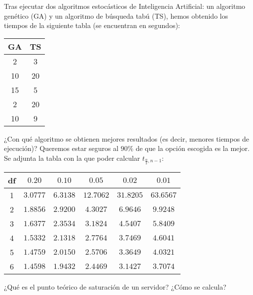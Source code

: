 \documentclass[12pt]{article}
\begin{document}
    \begin{ejercicio}[2 puntos]
        Tras ejecutar dos algoritmos estocásticos de Inteligencia Artificial: un algoritmo genético (GA) y un algoritmo de búsqueda tabú (TS), hemos obtenido los tiempos de la siguiente tabla (se encuentran en segundos):
        \begin{table}[H]
        \centering
        \begin{tabular}{c|c}
            GA & TS \\
            \hline
            2 & 3 \\
            10 & 20 \\
            15 & 5 \\
            2 & 20 \\
            10 & 9
        \end{tabular}
        \end{table}
        ¿Con qué algoritmo se obtienen mejores resultados (es decir, menores tiempos de ejecución)? Queremos estar seguros al $90\%$ de que la opción escogida es la mejor. Se adjunta la tabla con la que poder calcular $t_{\frac{\alpha}{2},n-1}$:
        \begin{table}[H]
        \centering
        \begin{tabular}{c|c|c|c|c|c}
            df & $0.20$ & $0.10$ & $0.05$ & $0.02$ & $0.01$ \\
            \hline
            1 & $3.0777$ & $6.3138$ & $12.7062$ & $31.8205$ & $63.6567$ \\
            \hline
            2 & $1.8856$ & $2.9200$ & $4.3027$ & $6.9646$ & $9.9248$ \\
            \hline
            3 & $1.6377$ & $2.3534$ & $3.1824$ & $4.5407$ & $5.8409$ \\
            \hline
            4 & $1.5332$ & $2.1318$ & $2.7764$ & $3.7469$ & $4.6041$ \\
            \hline
            5 & $1.4759$ & $2.0150$ & $2.5706$ & $3.3649$ & $4.0321$ \\
            \hline
            6 & $1.4598$ & $1.9432$ & $2.4469$ & $3.1427$ & $3.7074$
        \end{tabular}
        \end{table}
    \end{ejercicio}

    \begin{ejercicio}[1 punto]
        ¿Qué es el punto teórico de saturación de un servidor? ¿Cómo se calcula?
    \end{ejercicio}
\end{document}

